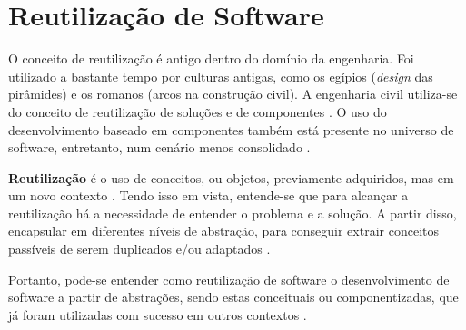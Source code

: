 \section{Reutilização de Software}
O conceito de reutilização é antigo dentro do domínio da engenharia. Foi utilizado a bastante tempo por culturas antigas, como os egípios (\textit{design} das pirâmides) e os romanos (arcos na construção civil). A engenharia civil utiliza-se do conceito de reutilização de soluções e de componentes \cite{sutcliffe2002}. O uso do desenvolvimento baseado em componentes também está presente no universo de software, entretanto, num cenário menos consolidado \cite{sutcliffe2002}.
\par
\indent \textbf{Reutilização} é o uso de conceitos, ou objetos, previamente adquiridos, mas em um novo contexto \cite{sutcliffe2002}. Tendo isso em vista, entende-se que para alcançar a reutilização há a necessidade de entender o problema e a solução. A partir disso, encapsular em diferentes níveis de abstração, para conseguir extrair conceitos passíveis de serem duplicados e/ou adaptados \cite{sutcliffe2002}.
\par
\indent Portanto, pode-se entender como reutilização de software o desenvolvimento de software a partir de abstrações, sendo estas conceituais ou componentizadas, que já foram utilizadas com sucesso em outros contextos \cite{sutcliffe2002}.

